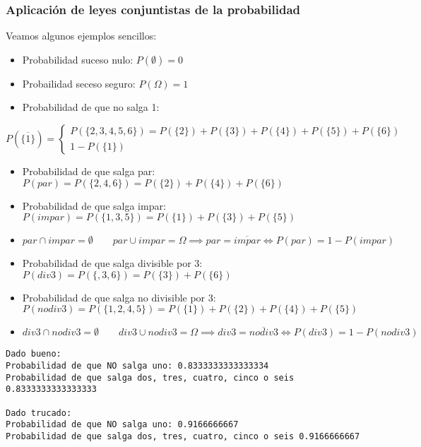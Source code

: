 \documentclass[11pt]{article}
\providecommand{\tightlist}{%
      \setlength{\itemsep}{0pt}\setlength{\parskip}{0pt}}
\begin{document}
    \subsubsection{Aplicación de leyes conjuntistas de la
probabilidad}\label{aplicaciuxf3n-de-leyes-conjuntistas-de-la-probabilidad}

    Veamos algunos ejemplos sencillos:

\begin{itemize}
\tightlist
\item
  Probabilidad suceso nulo: \(P(\emptyset)=0\)
\item
  Probailidad seceso seguro: \(P(\Omega)=1\)
\item
  Probabilidad de que no salga 1:
\end{itemize}

\[P(\overline{\{1\}})=
\begin{cases}
    P\left(\{2,3,4,5,6\}\right)=P(\{2\})+P(\{3\})+P(\{4\})+P(\{5\})+P(\{6\})\\
    1-P(\{1\})
  \end{cases}
\]

    \begin{itemize}
\tightlist
\item
  Probabilidad de que salga par:
  \(P(par)=P\left(\{2,4,6\}\right)=P(\{2\})+P(\{4\})+P(\{6\})\)
\item
  Probabilidad de que salga impar:
  \(P(impar)=P\left(\{1,3,5\}\right)=P(\{1\})+P(\{3\})+P(\{5\})\)
\item
  \(par \cap impar = \emptyset \qquad par \cup impar = \Omega \implies par = \overline{impar} \iff P(par) = 1 - P(impar)\)
\item
  Probabilidad de que salga divisible por 3:
  \(P(div3)=P\left(\{,3,6\}\right)=P(\{3\})+P(\{6\})\)
\item
  Probabilidad de que salga no divisible por 3:
  \(P(nodiv3)=P\left(\{1,2,4,5\}\right)=P(\{1\})+P(\{2\})+P(\{4\})+P(\{5\})\)
\item
  \(div3 \cap nodiv3 = \emptyset \qquad div3 \cup nodiv3 = \Omega \implies div3 = \overline{nodiv3} \iff P(div3) = 1 - P(nodiv3)\)
\end{itemize}

    \begin{Verbatim}[commandchars=\\\{\}]
Dado bueno:
Probabilidad de que NO salga uno: 0.8333333333333334
Probabilidad de que salga dos, tres, cuatro, cinco o seis 0.8333333333333333

Dado trucado:
Probabilidad de que NO salga uno: 0.9166666667
Probabilidad de que salga dos, tres, cuatro, cinco o seis 0.9166666667

    \end{Verbatim}
\end{document}
